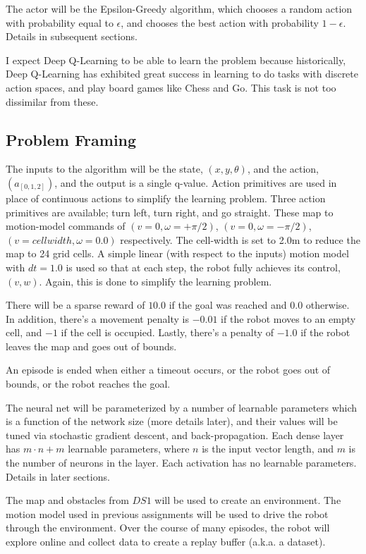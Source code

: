 \documentclass[11pt]{article}
\begin{document}
The actor will be the Epsilon-Greedy algorithm, which chooses a random action with probability equal to $\epsilon$, and chooses the best action with probability $1-\epsilon$. Details in subsequent sections.

I expect Deep Q-Learning to be able to learn the problem because historically, Deep Q-Learning has exhibited great success in learning to do tasks with discrete action spaces, and play board games like Chess and Go. This task is not too dissimilar from these.

\subsection{Problem Framing}

The inputs to the algorithm will be the state, $(x, y, \theta)$, and the action, $(a_{[0,1,2]})$, and the output is a single q-value. Action primitives are used in place of continuous actions to simplify the learning problem. Three action primitives are available; turn left, turn right, and go straight. These map to motion-model commands of $(v=0, \omega = +\pi/2)$, $(v=0, \omega = -\pi/2)$, $(v=cellwidth, \omega = 0.0)$ respectively. The cell-width is set to 2.0m to reduce the map to 24 grid cells. A simple linear (with respect to the inputs) motion model with $dt=1.0$ is used so that at each step, the robot fully achieves its control, $(v, w)$. Again, this is done to simplify the learning problem.

There will be a sparse reward of $10.0$ if the goal was reached and $0.0$ otherwise. In addition, there's a movement penalty is $-0.01$ if the robot moves to an empty cell, and $-1$ if the cell is occupied. Lastly, there's a penalty of $-1.0$ if the robot leaves the map and goes out of bounds.

An episode is ended when either a timeout occurs, or the robot goes out of bounds, or the robot reaches the goal.

The neural net will be parameterized by a number of learnable parameters which is a function of the network size (more details later), and their values will be tuned via stochastic gradient descent, and back-propagation. Each dense layer has $m \cdot n + m$ learnable parameters, where $n$ is the input vector length, and $m$ is the number of neurons in the layer. Each activation has no learnable parameters. Details in later sections.

The map and obstacles from $DS1$ will be used to create an environment. The motion model used in previous assignments will be used to drive the robot through the environment. Over the course of many episodes, the robot will explore online and collect data to create a replay buffer (a.k.a. a dataset). 
\end{document}
